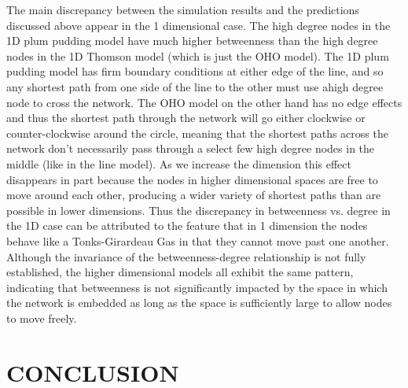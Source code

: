 \documentclass[aps,pre,reprint,superscriptaddress,amsmath,amssymb]{revtex4-1}
\begin{document}
The main discrepancy between the simulation results and the predictions discussed above appear in the 1 dimensional case.
The high degree nodes in the 1D plum pudding model have much higher betweenness than the high degree nodes in the 1D Thomson model (which is just the OHO model).
The 1D plum pudding model has firm boundary conditions at either edge of the line, and so any shortest path from one side of the line to the other must use ahigh degree node to cross the network.
The OHO model on the other hand has no edge effects and thus the shortest path through the network will go either clockwise or counter-clockwise around the circle, meaning that the shortest paths across the network don't necessarily pass through a select few high degree nodes in the middle (like in the line model).
As we increase the dimension this effect disappears in part because the nodes in higher dimensional spaces are free to move around each other, producing a wider variety of shortest paths than are possible in lower dimensions. 
Thus the discrepancy in betweenness vs. degree in the 1D case can be attributed to the feature that in 1 dimension the nodes behave like a Tonks-Girardeau Gas in that they cannot move past one another.
Although the invariance of the betweenness-degree relationship is not fully established, the higher dimensional models all exhibit the same pattern, indicating that betweenness is not significantly impacted by the space in which the network is embedded as long as the space is sufficiently large to allow nodes to move freely.

\section{CONCLUSION}


\end{document}
